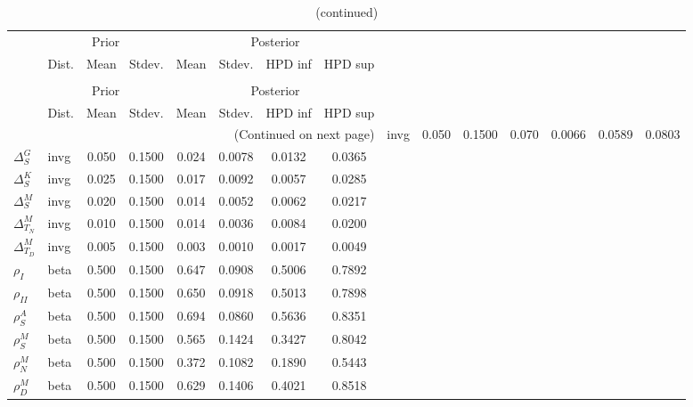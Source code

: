  
\begin{center}
\begin{longtable}{llcccccc} 
\caption{Results from Metropolis-Hastings (parameters)}
 \label{Table:MHPosterior:1}\\
\toprule 
  & \multicolumn{3}{c}{Prior}  &  \multicolumn{4}{c}{Posterior} \\
  \cmidrule(r{.75em}){2-4} \cmidrule(r{.75em}){5-8}
  & Dist. & Mean  & Stdev. & Mean & Stdev. & HPD inf & HPD sup\\
\midrule \endfirsthead 
\caption{(continued)}\\\toprule 
  & \multicolumn{3}{c}{Prior}  &  \multicolumn{4}{c}{Posterior} \\
  \cmidrule(r{.75em}){2-4} \cmidrule(r{.75em}){5-8}
  & Dist. & Mean  & Stdev. & Mean & Stdev. & HPD inf & HPD sup\\
\midrule \endhead 
\bottomrule \multicolumn{8}{r}{(Continued on next page)} \endfoot 
\bottomrule \endlastfoot 
${\Delta^{A}_{S}}$ & invg &   0.050 & 0.1500 &   0.070& 0.0066 &  0.0589 &  0.0803 \\ 
${\Delta^{G}_{S}}$ & invg &   0.050 & 0.1500 &   0.024& 0.0078 &  0.0132 &  0.0365 \\ 
${\Delta^{K}_{S}}$ & invg &   0.025 & 0.1500 &   0.017& 0.0092 &  0.0057 &  0.0285 \\ 
${\Delta^{M}_{S}}$ & invg &   0.020 & 0.1500 &   0.014& 0.0052 &  0.0062 &  0.0217 \\ 
${\Delta^{M}_{T_N}}$ & invg &   0.010 & 0.1500 &   0.014& 0.0036 &  0.0084 &  0.0200 \\ 
${\Delta^{M}_{T_D}}$ & invg &   0.005 & 0.1500 &   0.003& 0.0010 &  0.0017 &  0.0049 \\ 
${\rho_{I}}$ & beta &   0.500 & 0.1500 &   0.647& 0.0908 &  0.5006 &  0.7892 \\ 
${\rho_{II}}$ & beta &   0.500 & 0.1500 &   0.650& 0.0918 &  0.5013 &  0.7898 \\ 
${\rho^{A}_{S}}$ & beta &   0.500 & 0.1500 &   0.694& 0.0860 &  0.5636 &  0.8351 \\ 
${\rho^{M}_{S}}$ & beta &   0.500 & 0.1500 &   0.565& 0.1424 &  0.3427 &  0.8042 \\ 
${\rho^{M}_{N}}$ & beta &   0.500 & 0.1500 &   0.372& 0.1082 &  0.1890 &  0.5443 \\ 
${\rho^{M}_{D}}$ & beta &   0.500 & 0.1500 &   0.629& 0.1406 &  0.4021 &  0.8518 \\ 
\end{longtable}
 \end{center}
